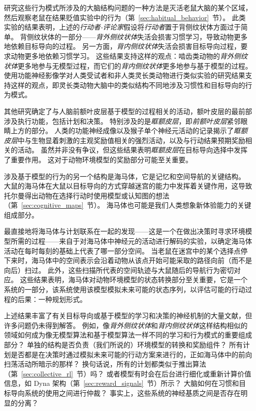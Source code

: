 研究这些行为模式所涉及的大脑结构问题的一种方法是灭活老鼠大脑的某个区域，然后观察老鼠在结果贬值实验中的行为（第~\ref{sec:habitual_behavior}~节）。
此类实验的结果表明，上述的\textit{行动者-评论家}假设将\textit{行动者}置于背侧纹状体方面过于简单。
背侧纹状体的一部分——\textit{背外侧纹状体}失活会损害习惯学习，导致动物更多地依赖目标导向的过程。
另一方面，\textit{背内侧纹状体}失活会损害目标导向过程，要求动物更多地依赖习惯学习。
这些结果支持这样的观点：啮齿类动物的\textit{背外侧纹状体}更多地参与无模型过程，而它们的\textit{背内侧纹状体}更多地参与基于模型的过程。
使用功能神经影像学对人类受试者和非人类灵长类动物进行类似实验的研究结果支持这样的观点，即灵长类动物大脑中的类似结构不同地涉及习惯性和目标导向的行为模式。


其他研究确定了与人脑前额叶皮层基于模型的过程相关的活动，额叶皮层的最前部涉及执行功能，包括计划和决策。
特别涉及的是\textit{眶额皮层}，即\textit{前额叶皮层}紧邻眼睛上方的部分。
人类的功能神经成像以及猴子单个神经元活动的记录揭示了\textit{眶额皮层}中与生物显着刺激的主观奖励值相关的强烈活动，以及与行动结果预期奖励相关的活动。
虽然并非没有争议，但这些结果表明\textit{眶额皮层}在目标导向选择中发挥了重要作用。
这对于动物环境模型的奖励部分可能至关重要。


涉及基于模型的行为的另一个结构是海马体，它是记忆和空间导航的关键结构。
大鼠的海马体在大鼠以目标导向的方式穿越迷宫的能力中发挥着关键作用，这导致托尔曼得出动物在选择行动时使用模型或认知图的想法（第~\ref{sec:cognitive_maps}~节）。
海马体也可能是我们人类想象新体验能力的关键组成部分\cite{hassabis2007deconstructing,olafsdottir2015hippocampal}。


最直接地将海马体与计划联系在一起的发现——这是一个在做出决策时寻求环境模型所需的过程——来自于对海马体中神经元的活动进行解码的实验，以确定海马体活动在每时每刻的基础上代表了哪一部分空间。
当老鼠在迷宫中的某个选择点停下来时，海马体中的空间表示会沿着动物从该点开始可能采取的路径向前（而不是向后）扫过\cite{johnson2007neural}。
此外，这些扫描所代表的空间轨迹与大鼠随后的导航行为密切对应\cite{pfeiffer2013hippocampal}。
这些结果表明，海马体对动物环境模型的状态转换部分至关重要，它是一个系统的一部分，该系统使用该模型模拟未来可能的状态序列，以评估可能的行动过程的后果：一种规划形式。


上述结果丰富了有关目标导向或基于模型的学习和决策的神经机制的大量文献，但许多问题仍未得到解答。
例如，像\textit{背外侧纹状体}和\textit{背内侧纹状体}这样结构相似的领域如何成为像无模型算法和基于模型算法一样不同的学习和行为模式的重要组成部分？
单独的结构是否负责（我们所说的）环境模型的转换和奖励组件？
所有计划是否都是在决策时通过模拟未来可能的行动方案来进行的，正如海马体中的前向扫荡活动所暗示的那样？
换句话说，所有的计划都类似于推出算法（第~\ref{sec:collective_rl}~节）吗？
或者模型有时会在后台进行细化或重新计算价值信息，如 Dyna 架构（第~\ref{sec:reward_signals}~节）所示？
大脑如何在习惯和目标导向系统的使用之间进行仲裁？
事实上，这些系统的神经基质之间是否存在明显的分离？


